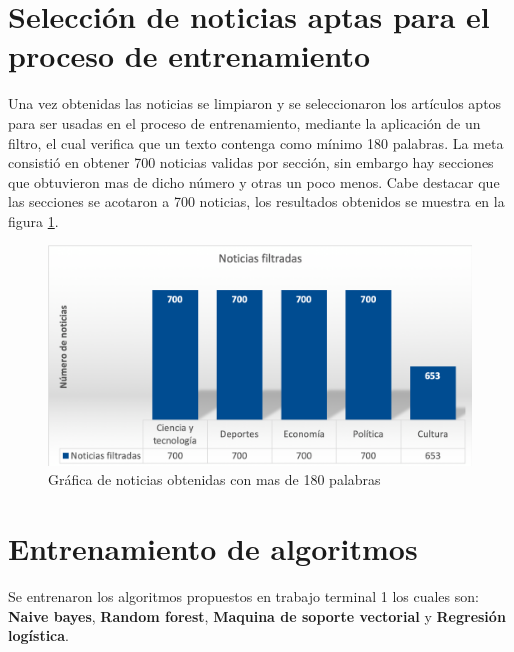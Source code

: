 \section{Selección de noticias aptas para el proceso de entrenamiento}

Una vez obtenidas las noticias se limpiaron y se seleccionaron los artículos aptos para ser usadas en el proceso de entrenamiento, mediante la aplicación de un filtro, el cual verifica que un texto contenga como mínimo 180 palabras. La meta consistió en obtener 700 noticias validas por sección, sin embargo hay secciones que obtuvieron mas de dicho número  y otras un poco menos. Cabe destacar que las secciones se  acotaron a 700 noticias, los resultados obtenidos se muestra en la figura \ref{fig:filtro}. 


\begin{figure}[h]
\centering
\includegraphics[scale=0.4]{imagenes/Resultados/Filtrado.png}
\caption{Gráfica de noticias obtenidas con mas de 180 palabras}
\label{fig:filtro}
\end{figure}

\section{Entrenamiento de algoritmos}

Se entrenaron los algoritmos propuestos en trabajo terminal 1 los cuales son: \textbf{Naive bayes}, \textbf{Random forest}, \textbf{Maquina de soporte vectorial} y \textbf{Regresión logística}.\\


